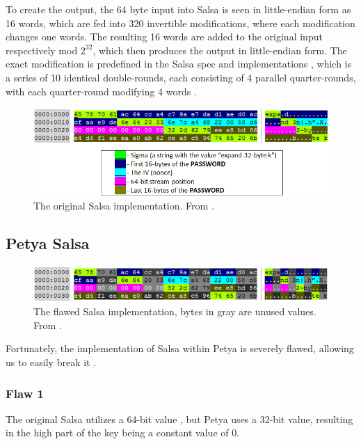 \documentclass[twocolumn]{article}
\begin{document}
To create the output, the 64 byte input into Salsa is seen in little-endian form as 16 words, which are fed into 320 invertible modifications, where each modification changes one words. The resulting 16 words are added to the original input respectively mod $2^{32}$, which then produces the output in little-endian form. The exact modification is predefined in the Salsa spec and implementations \cite{salsa20}, which is a series of 10 identical double-rounds, each consisting of 4 parallel quarter-rounds, with each quarter-round modifying 4 words \cite{salsa20Core}. 

\begin{figure}
	\includegraphics[width = \textwidth]{salsaChart.png}
	\caption{The original Salsa implementation. From \cite{decryptPetya}.}
	\label{fig:salsaChart}
\end{figure}

\subsection{Petya Salsa}

\begin{figure}
	\includegraphics[width = \textwidth]{badSalsaChart.png}
	\caption{The flawed Salsa implementation, bytes in gray are unused values. From \cite{decryptPetya}.}
	\label{fig:badSalsaChart}
\end{figure}

Fortunately, the implementation of Salsa within Petya is severely flawed, allowing us to easily break it \cite{decryptPetya}. 

\subsubsection{Flaw 1}
The original Salsa utilizes a 64-bit value \cite{salsa20}, but Petya uses a 32-bit value, resulting in the high part of the key being a constant value of 0. 
\end{document}
